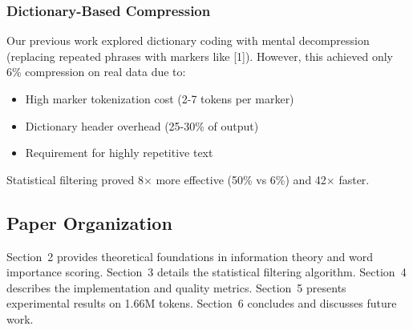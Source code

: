 \subsubsection{Dictionary-Based Compression}

Our previous work explored dictionary coding with mental decompression (replacing repeated phrases with markers like [1]). However, this achieved only 6\% compression on real data due to:
\begin{itemize}
    \item High marker tokenization cost (2-7 tokens per marker)
    \item Dictionary header overhead (25-30\% of output)
    \item Requirement for highly repetitive text
\end{itemize}

Statistical filtering proved 8× more effective (50\% vs 6\%) and 42× faster.

\subsection{Paper Organization}

Section~2 provides theoretical foundations in information theory and word importance scoring. Section~3 details the statistical filtering algorithm. Section~4 describes the implementation and quality metrics. Section~5 presents experimental results on 1.66M tokens. Section~6 concludes and discusses future work.
